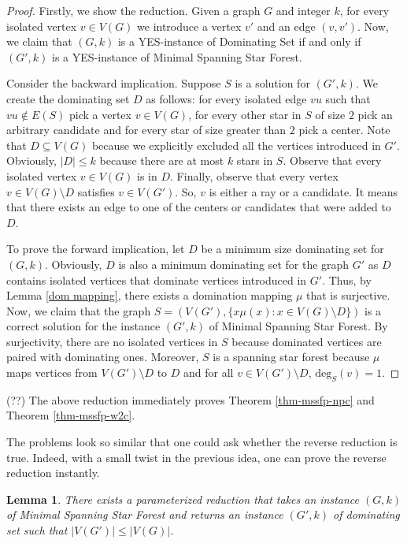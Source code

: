 \documentclass[en]{pracamgr}
\newtheorem{lemma}{Lemma}
\newcommand{\mssfp}{{\sc Minimal Spanning Star Forest}}
\newcommand{\domset}{dominating set}
\newcommand{\domsetp}{{\sc Dominating Set}}
\newcommand{\degree}[2]{\textrm{deg}_{#1}(#2)}
\begin{document}
\begin{proof}
	Firstly, we show the reduction. Given a graph $G$ and integer $k$, for every isolated vertex $v \in V(G)$ we introduce a vertex $v'$ and an edge $(v,v')$. Now, we claim that $(G,k)$ is a YES-instance of \domsetp{} if and only if $(G',k)$ is a YES-instance of \mssfp{}. 
	
	Consider the backward implication. Suppose $S$ is a solution for $(G',k)$. We create the \domset{} $D$ as follows: for every isolated edge $vu$ such that $vu \notin E(S)$ pick a vertex $v \in V(G)$, for every other star in $S$ of size $2$ pick an arbitrary candidate and for every star of size greater than $2$ pick a center. Note that $D \subseteq V(G)$ because we explicitly excluded all the vertices introduced in $G'$. Obviously, $|D| \leq k$ because there are at most $k$ stars in $S$. Observe that every isolated vertex $v \in V(G)$ is in $D$. Finally, observe that every vertex $v \in V(G) \setminus D$ satisfies $v \in V(G')$. So, $v$ is either a ray or a candidate. It means that there exists an edge to one of the centers or candidates that were added to $D$.
	
	To prove the forward implication, let $D$ be a minimum size dominating set for $(G,k)$. Obviously, $D$ is also a minimum dominating set for the graph $G'$ as $D$ contains isolated vertices that dominate vertices introduced in $G'$. Thus, by Lemma \ref{dom mapping}, there exists a domination mapping $\mu$ that is surjective. Now, we claim that the graph $S=(V(G'),\{x\mu(x): x \in V(G) \setminus D\})$ is a correct solution for the instance $(G',k)$ of \mssfp{}. By surjectivity, there are no isolated vertices in $S$ because dominated vertices are paired with dominating ones. Moreover, $S$ is a spanning star forest because $\mu$ maps vertices from $V(G') \setminus D$ to $D$ and for all $v \in V(G') \setminus D$, $\degree{S}{v}=1$.
	
\end{proof}

(??) The above reduction immediately proves Theorem \ref{thm-mssfp-npc} and Theorem \ref{thm-mssfp-w2c}.

The problems look so similar that one could ask whether the reverse reduction is true. Indeed, with a small twist in the previous idea, one can prove the reverse reduction instantly.

\begin{lemma}\label{ssf-dom reduction}
	There exists a parameterized reduction that takes an instance $(G,k)$ of \mssfp{} and returns an instance $(G',k)$ of \domset{} such that $|V(G')| \leq |V(G)|$. 
\end{lemma}
\end{document}
